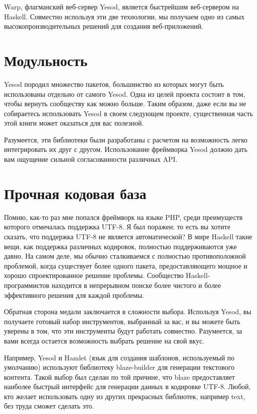Warp, флагманский веб-сервер Yesod, является быстрейшим веб-сервером на Haskell. Совместно используя эти две технологии, мы получаем одно из самых высокопроизводительных решений для создания веб-приложений.

\section{Модульность}

Yesod породил множество пакетов, большинство из которых могут быть использованы отдельно от самого Yesod. Одна из целей проекта состоит в том, чтобы вернуть сообществу как можно больше. Таким образом, даже если вы не собираетесь использовать Yesod в своем следующем проекте, существенная часть этой книги может оказаться для вас полезной.

Разумеется, эти библиотеки были разработаны с расчетом на возможность легко интегрировать их друг с другом. Использование фреймворка Yesod должно дать вам ощущение сильной согласованности различных API.

\section{Прочная кодовая база}

Помню, как-то раз мне попался фреймворк на языке PHP, среди преимуществ которого отмечалась поддержка UTF-8. Я был поражен: то есть вы хотите сказать, что поддержка UTF-8 не является автоматической? В мире Haskell такие вещи, как поддержка различных кодировок, полностью поддерживаются уже давно. На самом деле, мы обычно сталкиваемся с полностью противоположной проблемой, когда существует более одного пакета, предоставляющего мощное и хорошо спроектированное решение проблемы. Сообщество Haskell-программистов находится в непрерывном поиске более чистого и более эффективного решения для каждой проблемы.

Обратная сторона медали заключается в сложности выбора. Используя Yesod, вы получаете готовый набор инструментов, выбранный за вас, и вы можете быть уверены в том, что эти инструменты будут работать совместно. Разумеется, за вами всегда остается возможность выбрать решение на свой вкус.

Например, Yesod и Hamlet (язык для создания шаблонов, используемый по умолчанию) используют библиотеку blaze-builder для генерации текстового контента. Такой выбор был сделан по той причине, что blaze предоставляет наиболее быстрый интерфейс для генерации данных в кодировке UTF-8. Любой, кто желает использовать одну из других прекрасных библиотек, например text, без труда сможет сделать это.

